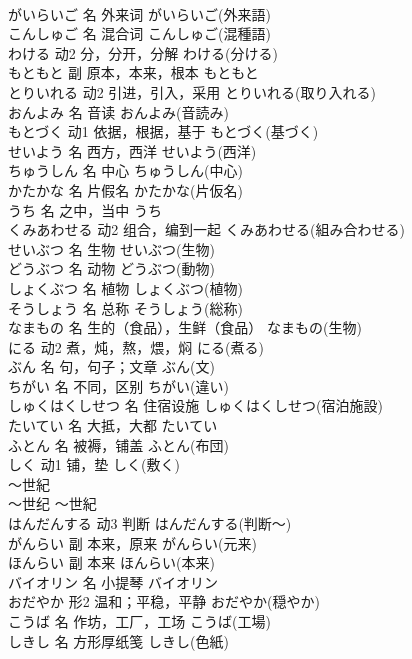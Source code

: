 \documentclass[8pt]{extreport}
\begin{document}
\begin{CJK}{UTF8}{min}
\\	がいらいご	名	外来词	がいらいご(外来語)	
\\	こんしゅご	名	混合词	こんしゅご(混種語)	
\\	わける	动2	分，分开，分解	わける(分ける)	
\\	もともと	副	原本，本来，根本	もともと	
\\	とりいれる	动2	引进，引入，采用	とりいれる(取り入れる)	
\\	おんよみ	名	音读	おんよみ(音読み)	
\\	もとづく	动1	依据，根据，基于	もとづく(基づく)	
\\	せいよう	名	西方，西洋	せいよう(西洋)	
\\	ちゅうしん	名	中心	ちゅうしん(中心)	
\\	かたかな	名	片假名	かたかな(片仮名)	
\\	うち	名	之中，当中	うち	
\\	くみあわせる	动2	组合，编到一起	くみあわせる(組み合わせる)	
\\	せいぶつ	名	生物	せいぶつ(生物)	
\\	どうぶつ	名	动物	どうぶつ(動物)	
\\	しょくぶつ	名	植物	しょくぶつ(植物)	
\\	そうしょう	名	总称	そうしょう(総称)	
\\	なまもの	名	生的（食品），生鲜（食品）	なまもの(生物)	
\\	にる	动2	煮，炖，熬，煨，焖	にる(煮る)	
\\	ぶん	名	句，句子；文章	ぶん(文)	
\\	ちがい	名	不同，区别	ちがい(違い)	
\\	しゅくはくしせつ	名	住宿设施	しゅくはくしせつ(宿泊施設)	
\\	たいてい	名	大抵，大都	たいてい	
\\	ふとん	名	被褥，铺盖	ふとん(布団)	
\\	しく	动1	铺，垫	しく(敷く)	
\\	～世紀	
\\	～世纪	～世紀	
\\	はんだんする	动3	判断	はんだんする(判断～)	
\\	がんらい	副	本来，原来	がんらい(元来)	
\\	ほんらい	副	本来	ほんらい(本来)	
\\	バイオリン	名	小提琴	バイオリン	
\\	おだやか	形2	温和；平稳，平静	おだやか(穏やか)	
\\	こうば	名	作坊，工厂，工场	こうば(工場)	
\\	しきし	名	方形厚纸笺	しきし(色紙)	

\end{CJK}
\end{document}
